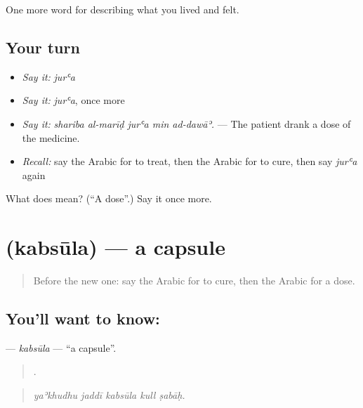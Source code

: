 \begin{grammarlens}[title={What you've built}]
One more word for describing what you lived and felt.
\end{grammarlens}

\subsection*{Your turn}
\begin{itemize}
\raggedright
  \item \emph{Say it:} \emph{jurʿa}
  \item \emph{Say it:} \emph{jurʿa}, once more
  \item \emph{Say it:} \emph{shariba al-marīḍ jurʿa min ad-dawāʾ.} — The patient drank a dose of the medicine.
  \item \emph{Recall:} say the Arabic for to treat, then the Arabic for to cure, then say \emph{jurʿa} again
\end{itemize}

\begin{tcolorbox}[breakable,colback=teal!4,colframe=teal!35!black,title={Before you move on}]
What does  mean? (\textquotedblleft{}A dose\textquotedblright{}.) Say it once more.
\end{tcolorbox}
\section[\texorpdfstring{\ar{كبسولة} (kabsūla)}{كبسولة (kabsūla)}]{ (kabsūla) — a capsule}

\label{lesson:AR-C511-kabsula}



\begin{quote}
Before the new one: say the Arabic for to cure, then the Arabic for a dose.
\end{quote}

\subsection*{You'll want to know: }
\textbf{} — \emph{kabsūla} — \textquotedblleft{}a capsule\textquotedblright{}.

\begin{quote}
    .
\end{quote}

\begin{quote}
\emph{yaʾkhudhu jaddī kabsūla kull ṣabāḥ.}
\end{quote}

